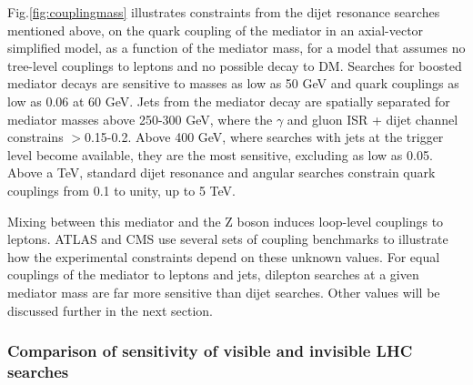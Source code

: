 Fig.\ref{fig:couplingmass} illustrates constraints from the dijet resonance searches mentioned above, on the quark coupling of the mediator in an axial-vector simplified model, as a function of the mediator mass, for a model that assumes no tree-level couplings to leptons and no possible decay to DM.
Searches for boosted mediator decays are sensitive to masses as low as 50 GeV and quark couplings \gq as low as 0.06 at 60 GeV.
Jets from the mediator decay are spatially separated for mediator masses above 250-300 GeV, where the $\gamma$ and gluon ISR + dijet channel constrains \gq$>$0.15-0.2.
Above 400 GeV, where searches with jets at the trigger level become available, they are the most sensitive, excluding \gq as low as 0.05.
Above a TeV, standard dijet resonance and angular searches constrain quark couplings from 0.1 to unity, up to 5 TeV. 

Mixing between this mediator and the Z boson induces loop-level couplings to leptons. ATLAS and CMS use several sets of coupling benchmarks to illustrate how the experimental constraints depend on these unknown values.
For equal couplings of the mediator to leptons and jets, dilepton searches at a given mediator mass are far more sensitive than dijet searches. Other values will be discussed further in the next section.%


\subsubsection{Comparison of sensitivity of visible and invisible LHC searches}
\label{sub:comparisonVisibleInvisible}

